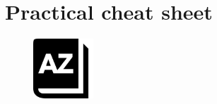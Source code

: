 \documentclass[
  letterpaper,
  DIV=11,
  numbers=noendperiod]{scrreprt}
\begin{document}
\cleardoublepage
{}
{}
\appendix

\hypertarget{cheatsheet}{%
\chapter{Practical cheat sheet}\label{cheatsheet}}

\begin{figure}

{\centering \includegraphics[width=0.2\textwidth,height=\textheight]{figures/cheatsheet.png}

}

\end{figure}
\end{document}
